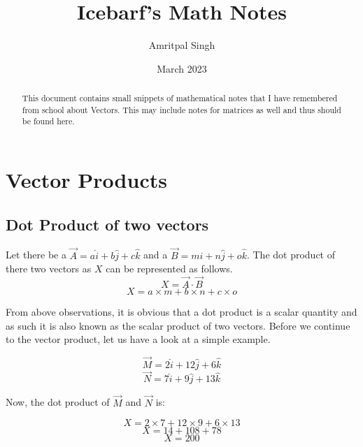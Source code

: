 \documentclass[12pt, a4paper]{article}
\title{Icebarf's Math Notes}
\author{Amritpal Singh}
\date{March 2023}
\begin{document}
	\maketitle
	\begin{abstract}
		This document contains small snippets of mathematical notes that I have 
		remembered from school about Vectors. This may include notes for 
		matrices as well and thus should be found here.
	\end{abstract}

	\section{Vector Products}
	\subsection{Dot Product of two vectors}
	Let there be a $\overrightarrow{A} = a\hat{i} + b\hat{j} + c\hat{k}$ and a 
	$\overrightarrow{B} = m\hat{i} + n\hat{j} + o\hat{k}$. The dot product of 
	there two vectors as $X$ can be represented as follows.
	\begin{displaymath}
		X = \overrightarrow{A} \cdot \overrightarrow{B}
	\end{displaymath}
	\begin{displaymath}
		X = a \times m + b \times n + c \times o
	\end{displaymath}

	From above observations, it is obvious that a dot product is a scalar 
	quantity and as such it is also known as the scalar product of two vectors.
	Before we continue to the vector product, let us have a look at a simple 
	example.
	
	\begin{displaymath}
		\overrightarrow{M} = 2\hat{i} + 12\hat{j} + 6\hat{k} 
	\end{displaymath}
	\begin{displaymath}
		\overrightarrow{N} = 7\hat{i} + 9\hat{j} + 13\hat{k} 
	\end{displaymath}
	
	Now, the dot product of $\overrightarrow{M}$ and $\overrightarrow{N}$ is:
	
	\begin{displaymath}
		X = 2 \times 7 + 12 \times 9 + 6 \times 13
	\end{displaymath}
	\begin{displaymath}
		X = 14 + 108 + 78
	\end{displaymath}
	\begin{displaymath}
		X = 200
	\end{displaymath}
\end{document}
